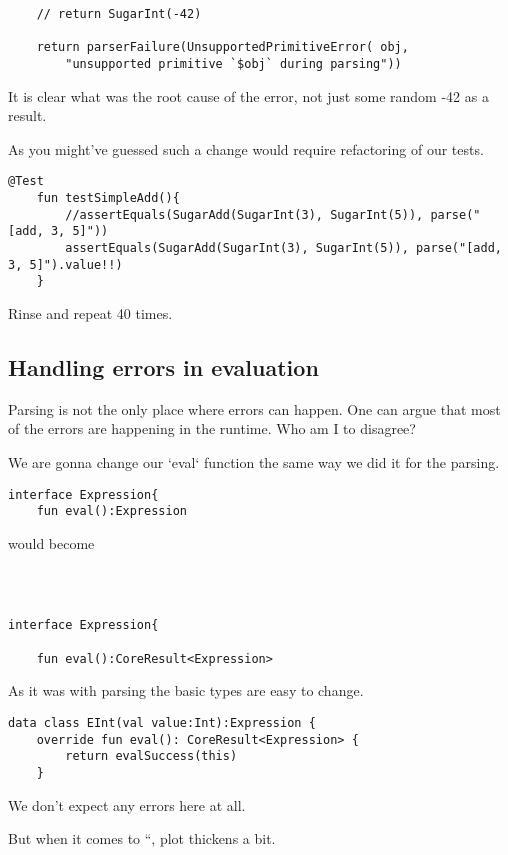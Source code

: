 \documentclass[11pt]{article}
\begin{document}
\begin{verbatim}
    // return SugarInt(-42)

    return parserFailure(UnsupportedPrimitiveError( obj,
        "unsupported primitive `$obj` during parsing"))
\end{verbatim}

It is clear what was the root cause of the error, not just some random -42 as a result.

As you might've guessed such a change would require refactoring of our tests.

\begin{verbatim}
@Test
    fun testSimpleAdd(){
        //assertEquals(SugarAdd(SugarInt(3), SugarInt(5)), parse("[add, 3, 5]"))
        assertEquals(SugarAdd(SugarInt(3), SugarInt(5)), parse("[add, 3, 5]").value!!)
    }
\end{verbatim}

Rinse and repeat 40 times.
\subsection{Handling errors in evaluation}
\label{sec:orge32449e}
Parsing is not the only place where errors can happen. One can argue that most of the errors are happening in the runtime. Who am I to disagree?

We are gonna change our `eval` function the same way we did it for the parsing.

\begin{verbatim}
interface Expression{
    fun eval():Expression
\end{verbatim}

would become

\begin{verbatim}



interface Expression{

    fun eval():CoreResult<Expression>
\end{verbatim}

As it was with parsing the basic types are easy to change.

\begin{verbatim}
data class EInt(val value:Int):Expression {
    override fun eval(): CoreResult<Expression> {
        return evalSuccess(this)
    }
\end{verbatim}

We don't expect any errors here at all.

But when it comes to ``, plot thickens a bit.
\end{document}
